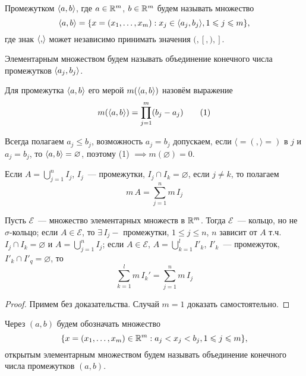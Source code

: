 \documentclass[main]{subfiles}
\begin{document}
\begin{definition}
    Промежутком $\langle{a,b}\rangle$, где $a\in\mathbb{R}^m$, $ b\in\mathbb{R}^m$ будем называть множество
    \[\langle{a,b}\rangle = \{x = (x_1,\dotsc,x_m): x_j \in \langle{a_j, b_j}\rangle, 1 \leqslant j \leqslant m\},\]
    где знак $\langle{,}\rangle$ может независимо принимать значения $(,[,),]$.
\end{definition}

\begin{definition}
    Элементарным множеством будем называть объединение конечного числа промежутков $\langle{a_j,b_j}\rangle$.
\end{definition}

\begin{definition}
    Для промежутка $\langle{a,b}\rangle$ его мерой $m(\langle{a,b}\rangle)$ назовём выражение
    \[ m(\langle{a,b}\rangle)=\prod_{j=1}^{m}(b_j-a_j)\tag{1} \]
\end{definition}

\begin{remark}
    Всегда полагаем $a_j\le b_j$, возможность $a_j=b_j$ допускаем, если $\langle=(, \rangle = )$ в $j$ и $a_j=b_j$, то $\langle{a,b}\rangle=\varnothing$, поэтому (1) $\implies m(\varnothing)=0$.
\end{remark}

\begin{remark}
    Если $A = \bigcup_{j=1}^n I_j$, $I_j$~--- промежутки, $I_j \cap I_k=\varnothing$, если $j\neq k$, то полагаем
    \[ m\,A=\sum_{j=1}^n m\,I_j\tag{2} \]
\end{remark}

\begin{theorem}
    Пусть $\mathcal{E}$~--- множество элементарных множеств в $\mathbb{R}^m$.
    Тогда $\mathcal{E}$~--- кольцо, но не $\sigma$-кольцо; если $A\in\mathcal{E}$, то $\exists\,I_j-$ промежутки, $1\le j\le n$, $n$ зависит от $A$ т.ч. $I_j\cap I_k=\varnothing$ и $A=\bigcup_{j=1}^n I_j$; если $A\in\mathcal{E}$, $ A=\bigcup_{k=1}^l I'_k$, $I'_k$~--- промежуток, $I'_k\cap I'_q=\varnothing$, то
    \[ \sum_{k=1}^l m\,I_k'=\sum_{j=1}^n m\,I_j \]
\end{theorem}

\begin{proof}
    Примем без доказательства.
    Случай $m=1$ доказать самостоятельно.
\end{proof}

\begin{definition}
    Через $(a,b)$ будем обозначать множество
    \[\{ x=(x_1,\dotsc,x_m)\in\mathbb{R}^m: a_j<x_j<b_j, 1\leqslant j\leqslant m\},\]
    открытым элементарным множеством будем называть объединение конечного числа промежутков $(a,b)$.
\end{definition}
\end{document}
